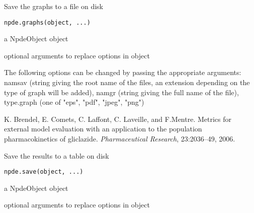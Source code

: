 \documentclass[a4paper]{book}
\begin{document}
%
\begin{Description}\relax
Save the graphs to a file on disk
\end{Description}
%
\begin{Usage}
\begin{verbatim}
npde.graphs(object, ...)
\end{verbatim}
\end{Usage}
%
\begin{Arguments}
\begin{ldescription}
\item[\code{object}] a NpdeObject object

\item[\code{...}] optional arguments to replace options in object
\end{ldescription}
\end{Arguments}
%
\begin{Details}\relax
The following options can be changed by passing the appropriate arguments: namsav (string giving the root name of the files, an extension depending on the type of graph will be added), namgr (string giving the full name of the file), type.graph (one of "eps", "pdf", "jpeg", "png")
\end{Details}
%
\begin{References}\relax
K. Brendel, E. Comets, C. Laffont, C. Laveille, and F.Mentre. Metrics for external model evaluation with an application to the population pharmacokinetics of gliclazide. \emph{Pharmaceutical Research}, 23:2036--49, 2006.
\end{References}
%
\begin{Description}\relax
Save the results to a table on disk
\end{Description}
%
\begin{Usage}
\begin{verbatim}
npde.save(object, ...)
\end{verbatim}
\end{Usage}
%
\begin{Arguments}
\begin{ldescription}
\item[\code{object}] a NpdeObject object

\item[\code{...}] optional arguments to replace options in object
\end{ldescription}
\end{Arguments}
\end{document}
